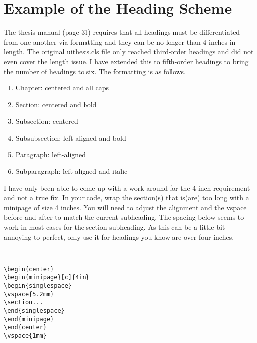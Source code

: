 \newpage{}

\chapter{Example of the Heading Scheme}\label{appendix:headings}

The thesis manual (page 31) requires that all headings must be differentiated
from one another via formatting and they can be no longer than 4 inches
in length. The original uithesis.cls file only reached third-order
headings and did not even cover the length issue. I have extended
this to fifth-order headings to bring the number of headings to six.
The formatting is as follows.
\begin{enumerate}
\item Chapter: centered and all caps
\item Section: centered and bold
\item Subsection: centered
\item Subsubsection: left-aligned and bold
\item Paragraph: left-aligned
\item Subparagraph: left-aligned and italic
\end{enumerate}
I have only been able to come up with a work-around for the 4 inch
requirement and not a true fix. In your code, wrap the section(s)
that is(are) too long with a minipage of size 4 inches. You will need
to adjust the alignment and the vspace before and after to match the
current subheading. The spacing below seems to work in most cases
for the section subheading. As this can be a little bit annoying to
perfect, only use it for headings you know are over four inches.

~

\begin{singlespace} %
\begin{verbatim}
\begin{center}
\begin{minipage}[c]{4in}
\begin{singlespace}
\vspace{5.2mm}
\section...
\end{singlespace}
\end{minipage}
\end{center}
\vspace{1mm}
\end{verbatim}
\end{singlespace}

